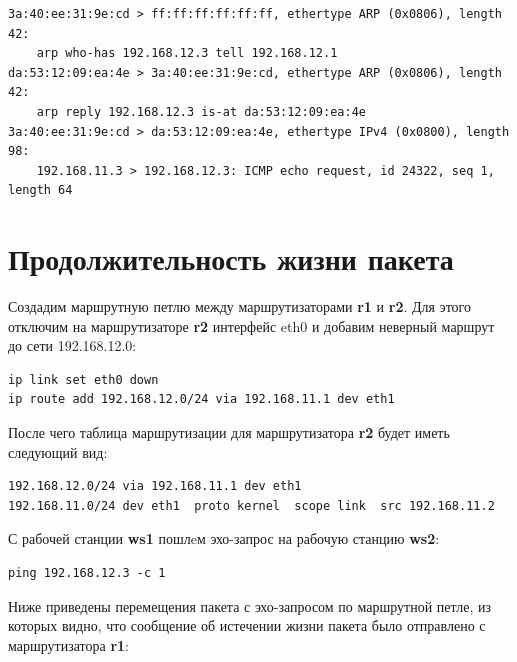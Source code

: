 \documentclass[a4paper,12pt]{article}
\begin{document}
\begin{Verbatim}
3a:40:ee:31:9e:cd > ff:ff:ff:ff:ff:ff, ethertype ARP (0x0806), length 42: 
    arp who-has 192.168.12.3 tell 192.168.12.1
da:53:12:09:ea:4e > 3a:40:ee:31:9e:cd, ethertype ARP (0x0806), length 42:
    arp reply 192.168.12.3 is-at da:53:12:09:ea:4e
3a:40:ee:31:9e:cd > da:53:12:09:ea:4e, ethertype IPv4 (0x0800), length 98:
    192.168.11.3 > 192.168.12.3: ICMP echo request, id 24322, seq 1, length 64
\end{Verbatim}

\section{Продолжительность жизни пакета}

Создадим маршрутную петлю между маршрутизаторами \textbf{r1} и \textbf{r2}. Для этого
отключим на маршрутизаторе \textbf{r2} интерфейс eth0 и добавим неверный маршрут 
до сети 192.168.12.0:

\begin{Verbatim}
ip link set eth0 down
ip route add 192.168.12.0/24 via 192.168.11.1 dev eth1
\end{Verbatim}

После чего таблица маршрутизации для маршрутизатора \textbf{r2} будет иметь следующий вид:

\begin{Verbatim}
192.168.12.0/24 via 192.168.11.1 dev eth1 
192.168.11.0/24 dev eth1  proto kernel  scope link  src 192.168.11.2
\end{Verbatim}

С рабочей станции \textbf{ws1} пошлeм эхо-запрос на рабочую станцию \textbf{ws2}:

\begin{Verbatim}
ping 192.168.12.3 -c 1
\end{Verbatim}

Ниже приведены перемещения пакета с эхо-запросом по маршрутной петле, из которых
видно, что сообщение об истечении жизни пакета было отправлено с маршрутизатора
\textbf{r1}:
\end{document}
